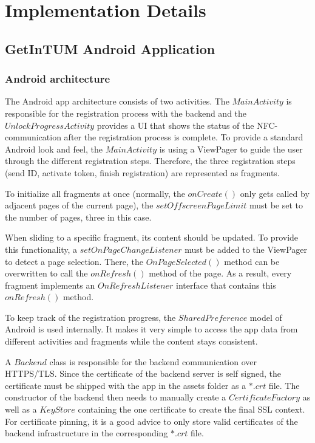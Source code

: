\section{Implementation Details}\label{sec:impl}

\subsection{GetInTUM Android Application}\label{sec:android}


\subsubsection{Android architecture}
The Android app architecture consists of two activities. The $MainActivity$ is responsible for the registration process with the backend and the $UnlockProgressActivity$ provides a UI that shows the status of the NFC-communication after the registration process is complete. To provide a standard Android look and feel, the $MainActivity$ is using a ViewPager to guide the user through the different registration steps. Therefore, the three registration steps (send ID, activate token, finish registration) are represented as fragments.

To initialize all fragments at once (normally, the $onCreate()$ only gets called by adjacent pages of the current page), the $setOffscreenPageLimit$ must be set to the number of pages, three in this case.

When sliding to a specific fragment, its content should be updated. To provide this functionality, a $setOnPageChangeListener$ must be added to the ViewPager to detect a page selection. There, the $OnPageSelected()$ method can be overwritten to call the $onRefresh()$ method of the page. As a result, every fragment implements an $OnRefreshListener$ interface that contains this $onRefresh()$ method.

To keep track of the registration progress, the $SharedPreference$ model of Android is used internally. It makes it very simple to access the app data from different activities and fragments while the content stays consistent.

A $Backend$ class is responsible for the backend communication over HTTPS/TLS. Since the certificate of the backend server is self signed, the certificate must be shipped with the app in the assets folder as a $*.crt$ file. The constructor of the backend then needs to manually create a $CertificateFactory$ as well as a $KeyStore$ containing the one certificate to create the final SSL context.
For certificate pinning, it is a good advice to only store valid certificates of the backend infrastructure in the corresponding $*.crt$ file.

